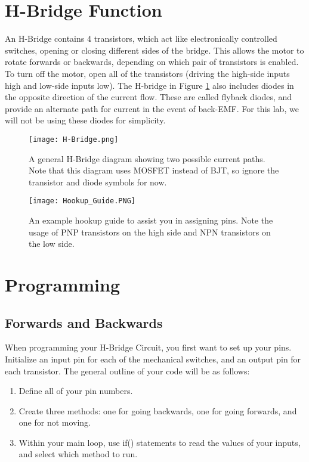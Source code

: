 \documentclass{article}
\begin{document}
\section{H-Bridge Function}
An H-Bridge contains 4 transistors, which act like electronically controlled switches, opening or closing different sides of the bridge. This allows the motor to rotate forwards or backwards, depending on which pair of transistors is enabled. To turn off the motor, open all of the transistors (driving the high-side inputs high and low-side inputs low). The H-bridge in Figure \ref{fig:h-bridge} also includes diodes in the opposite direction of the current flow. These are called flyback diodes, and provide an alternate path for current in the event of back-EMF. For this lab, we will not be using these diodes for simplicity.
\begin{figure}[ht]
	\center
	\texttt{[image: H-Bridge.png]}
	\caption{A general H-Bridge diagram showing two possible current paths. Note that this diagram uses MOSFET instead of BJT, so ignore the transistor and diode symbols for now.}
	\label{fig:h-bridge}
\end{figure}

\begin{figure}[ht]
	\center
	\texttt{[image: Hookup\_Guide.PNG]}
	\caption{An example hookup guide to assist you in assigning pins. Note the usage of PNP transistors on the high side and NPN transistors on the low side.}
	\label{fig:hookup}
\end{figure}
\clearpage

\section{Programming}
\subsection{Forwards and Backwards}
When programming your H-Bridge Circuit, you first want to set up your pins. Initialize an input pin for each of the mechanical switches, and an output pin for each transistor. The general outline of your code will be as follows:
\begin{enumerate}
    \item Define all of your pin numbers.
    \item Create three methods: one for going backwards, one for going forwards, and one for not moving.
    \item Within your main loop, use if() statements to read the values of your inputs, and select which method to run.
\end{enumerate}
\end{document}
